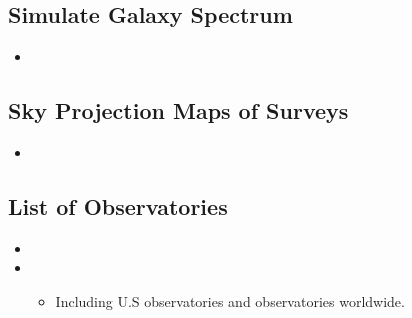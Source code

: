\documentclass[letterpaper,10pt,english]{sphinxmanual}
\begin{document}
\subsection{Simulate Galaxy Spectrum}
\label{\detokenize{resource/astro/astro_research_basic:simulate-galaxy-spectrum}}\begin{itemize}
\item {} 

\end{itemize}


\subsection{Sky Projection Maps of Surveys}
\label{\detokenize{resource/astro/astro_research_basic:sky-projection-maps-of-surveys}}\begin{itemize}
\item {} 

\end{itemize}


\subsection{List of Observatories}
\label{\detokenize{resource/astro/astro_research_basic:list-of-observatories}}\begin{itemize}
\item {} 

\item {} 
\begin{itemize}
\item {} 
Including U.S observatories and observatories worldwide.

\end{itemize}

\end{itemize}
\end{document}
